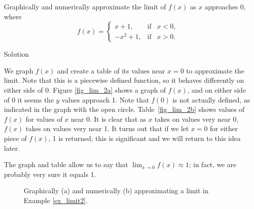 \ifvc
\begin{example}\label{ex_limit2}
Graphically and numerically approximate the limit of $f(x)$ as $x$ approaches 0, where 
$$f(x) = \left\{\begin{array}{lcl} x+1, & \mbox{if} & x< 0, \\ -x^2+1, &\mbox{if} & x > 0. \end{array}\right.$$

Solution 


We graph $f(x)$ and create a table of its values near $x=0$ to approximate the limit. Note that this is a piecewise defined function, so it behaves differently on either side of 0. Figure \ref{fig_lim_2a} shows a graph of $f(x)$, and on either side of 0 it seems the $y$ values approach 1. Note that $f(0)$ is not actually defined, as indicated in the graph with the open circle. Table~\ref{fig_lim_2b} shows values of $f(x)$ for values of $x$ near 0. It is clear that as $x$ takes on values very near 0, $f(x)$ takes on values very near 1. It turns out that if we let $x=0$ for either piece of $f(x)$, 1 is returned; this is significant and we will return to this idea later.

The graph and table allow us to say that $\lim_{x\to 0}f(x) \approx 1$; in fact, we are probably very sure it equals 1.

\begin{figure}[H]
  \centering
  \qquad
\caption{Graphically (a) and numerically (b) approximating a limit in Example \ref{ex_limit2}.}
\end{figure}

\end{example}
\fi



